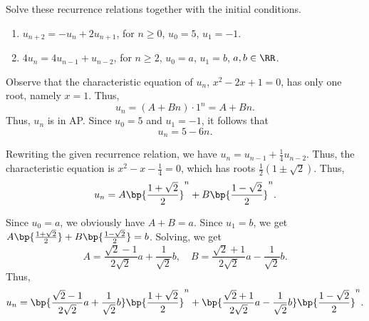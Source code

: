 \begin{problem}
    Solve these recurrence relations together with the initial conditions.

    \begin{enumerate}
        \item $u_{n+2} = -u_n + 2u_{n+1}$, for $n \geq 0$, $u_0 = 5$, $u_1 = -1$.
        \item $4u_n = 4u_{n-1} + u_{n-2}$, for $n \geq 2$, $u_0 = a$, $u_1 = b$, $a, b \in \RR$.
    \end{enumerate}
\end{problem}
\begin{solution}
    \begin{ppart}
        Observe that the characteristic equation of $u_n$, $x^2 - 2x + 1 = 0$, has only one root, namely $x = 1$. Thus, \[u_n = (A + Bn) \cdot 1^n = A + Bn.\] Thus, $u_n$ is in AP. Since $u_0 = 5$ and $u_1 = -1$, it follows that \[u_n = 5 - 6n.\]
    \end{ppart}
    \begin{ppart}
        Rewriting the given recurrence relation, we have $u_n = u_{n-1} + \frac14 u_{n-2}$. Thus, the characteristic equation is $x^2 - x - \frac14 = 0$, which has roots $\frac12 (1 \pm \sqrt2)$. Thus, \[u_n = A \bp{\frac{1 + \sqrt2}{2}}^n + B\bp{\frac{1 - \sqrt2}{2}}^n.\]

        Since $u_0 = a$, we obviously have $A + B = a$. Since $u_1 = b$, we get $A\bp{\frac{1 + \sqrt2}{2}} + B\bp{\frac{1 - \sqrt2}{2}} = b$. Solving, we get \[A = \frac{\sqrt2 - 1}{2\sqrt2}a + \frac{1}{\sqrt{2}}b, \quad B = \frac{\sqrt2 + 1}{2\sqrt2}a - \frac{1}{\sqrt{2}}b.\] Thus, \[u_n = \bp{\frac{\sqrt2 - 1}{2\sqrt2}a + \frac{1}{\sqrt{2}}b}\bp{\frac{1 + \sqrt2}{2}}^n + \bp{\frac{\sqrt2 + 1}{2\sqrt2}a - \frac{1}{\sqrt{2}}b}\bp{\frac{1 - \sqrt2}{2}}^n.\]
    \end{ppart}
\end{solution}


